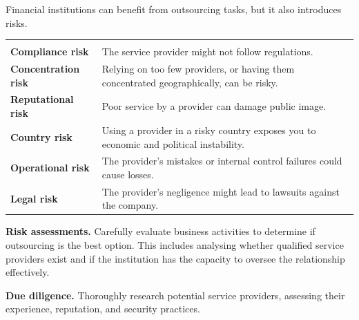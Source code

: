 


Financial institutions can benefit from outsourcing tasks, but it also introduces
risks.

\noindent\begin{minipage}{\textwidth}
\renewcommand{\arraystretch}{1.35}
\begin{tabularx}{\textwidth}{@{}L{0.22\textwidth}Y@{}}
  & \\
{\tabfont \textbf{Compliance risk}} & {\tabfont The service provider might not follow regulations.}\\
{\tabfont \textbf{Concentration risk}} & {\tabfont Relying on too few providers, or having them concentrated geographically, can be risky.}\\
{\tabfont \textbf{Reputational risk}} & {\tabfont Poor service by a provider can damage public image.}\\
{\tabfont \textbf{Country risk}} & {\tabfont Using a provider in a risky country exposes you to economic and political instability.}\\
{\tabfont \textbf{Operational risk}} & {\tabfont The provider's mistakes or internal control failures could cause losses.}\\
{\tabfont \textbf{Legal risk}} & {\tabfont The provider's negligence might lead to lawsuits against the company.}\\
\end{tabularx}
\end{minipage}


\begin{lettered}
\item \textbf{Risk assessments.} Carefully evaluate business activities to
determine if outsourcing is the best option. This includes analysing whether
qualified service providers exist and if the institution has the capacity to
oversee the relationship effectively.
\item \textbf{Due diligence.} Thoroughly research potential service providers,
assessing their experience, reputation, and security practices.
\end{lettered}

